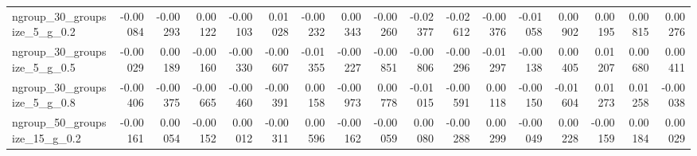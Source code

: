 \documentclass[10pt, a4paper, titlepage]{article}
\begin{document}
\begin{landscape}
\begin{table}[]
{\begin{tabular}{l|rrrr|rrrr|rrrr|rrrr}
ngroup\_30\_groupsize\_5\_g\_0.2  & -0.00084                          & -0.00293                           & 0.00122                            & -0.00103                                & 0.01028                           & -0.00232                           & 0.00343                            & -0.00260                                & -0.02377                          & -0.02612                           & -0.00376                           & -0.01058                                & 0.00902                           & 0.00195                            & 0.00815                            & 0.00276                                \\
ngroup\_30\_groupsize\_5\_g\_0.5  & -0.00029                          & 0.00189                            & -0.00160                           & -0.00330                                & -0.00607                          & -0.01355                           & -0.00227                           & -0.00851                                & -0.00806                          & -0.00296                           & -0.01297                           & -0.00138                                & 0.00405                           & 0.01207                            & 0.00680                            & 0.00411                                \\
ngroup\_30\_groupsize\_5\_g\_0.8  & -0.00406                          & -0.00375                           & -0.00665                           & -0.00460                                & -0.00391                          & 0.00158                            & -0.00973                           & 0.00778                                 & -0.01015                          & -0.00591                           & 0.00118                            & -0.00150                                & -0.01604                          & 0.01273                            & 0.01258                            & -0.00038                               \\
ngroup\_50\_groupsize\_15\_g\_0.2 & -0.00161                          & 0.00054                            & -0.00152                           & 0.00012                                 & -0.00311                          & 0.00596                            & -0.00162                           & -0.00059                                & 0.00080                           & -0.00288                           & 0.00299                            & -0.00049                                & 0.00228                           & -0.00159                           & 0.00184                            & 0.00029                                \\

\end{tabular}}
\end{table}
\end{landscape}
\end{document}
